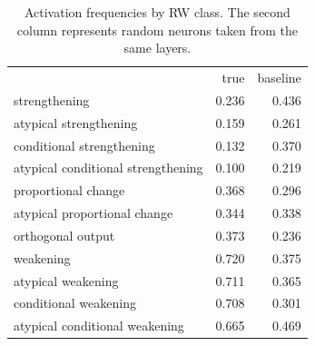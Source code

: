 \begin{table}
\caption{
                Activation frequencies by RW class.
                The second column represents random neurons taken from the same layers.
                }
\label{tab:summary}
\begin{tabular}{lrr}
 & true & baseline \\
strengthening & 0.236 & 0.436 \\
atypical strengthening & 0.159 & 0.261 \\
conditional strengthening & 0.132 & 0.370 \\
atypical conditional strengthening & 0.100 & 0.219 \\
proportional change & 0.368 & 0.296 \\
atypical proportional change & 0.344 & 0.338 \\
orthogonal output & 0.373 & 0.236 \\
weakening & 0.720 & 0.375 \\
atypical weakening & 0.711 & 0.365 \\
conditional weakening & 0.708 & 0.301 \\
atypical conditional weakening & 0.665 & 0.469 \\
\end{tabular}
\end{table}
